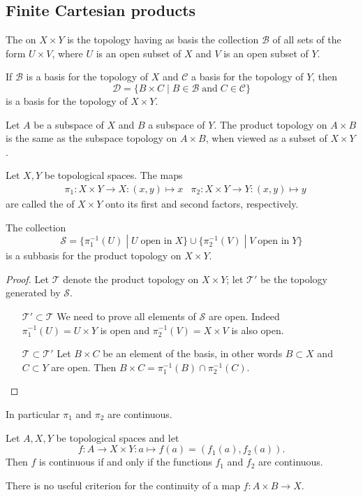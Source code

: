 \subsection{Finite Cartesian products}
\begin{definition}
The  on $X\times Y$ is the topology having as basis the collection $\mathcal{B}$ of all sets of the form $U\times V$, where $U$ is an open subset of $X$ and $V$ is an open subset of $Y$.
\end{definition}
\begin{lemma} \label{basisFiniteProductTopology}
If $\mathcal{B}$ is a basis for the topology of $X$ and $\mathcal{C}$ a basis for the topology of $Y$, then
\[ \mathcal{D} = \{ B\times C\;|\; B\in \mathcal{B}\;\text{and}\; C\in \mathcal{C} \} \]
is a basis for the topology of $X\times Y$.
\end{lemma}
\begin{proposition}
Let $A$ be a subspace of $X$ and $B$ a subspace of $Y$. The product topology on $A\times B$ is the same as the subspace topology on $A\times B$, when viewed as a subset of $X\times Y$.
\end{proposition}

\begin{definition}
Let $X,Y$ be topological spaces. The maps
\begin{align*}
&\pi_1: X\times Y\to X: (x,y)\mapsto x
&\pi_2: X\times Y\to Y: (x,y)\mapsto y
\end{align*}
are called the  of $X\times Y$ onto its first and second factors, respectively.
\end{definition}
\begin{proposition}
The collection
\[ \mathcal{S} = \{ \pi_1^{-1}(U)\;|\; U\;\text{open in}\; X \}\cup \{ \pi_2^{-1}(V)\;|\; V\;\text{open in}\;Y  \} \]
is a subbasis for the product topology on $X\times Y$.
\end{proposition}
\begin{proof}
Let $\mathcal{T}$ denote the product topology on $X\times Y$; let $\mathcal{T'}$ be the topology generated by $\mathcal{S}$.
\begin{itemize}[leftmargin=2cm]
\item[$\boxed{\mathcal{T}'\subset\mathcal{T}}$] We need to prove all elements of $\mathcal{S}$ are open. Indeed $\pi_1^{-1}(U) = U\times Y$ is open and $\pi_2^{-1}(V) = X\times V$ is also open.
\item[$\boxed{\mathcal{T}\subset\mathcal{T}'}$] Let $B\times C$ be an element of the basis, in other words $B\subset X$ and $C\subset Y$ are open. Then $B\times C = \pi_1^{-1}(B)\cap \pi_2^{-1}(C)$.
\end{itemize}
\end{proof}
In particular $\pi_1$ and $\pi_2$ are continuous.
\begin{proposition}\label{continuityCompositeFunctions}
Let $A,X,Y$ be topological spaces and let
\[ f:A\to X\times Y: a\mapsto f(a) = (f_1(a),f_2(a)). \]
Then $f$ is continuous \textup{if and only if} the functions $f_1$ and $f_2$ are continuous.
\end{proposition}
There is no useful criterion for the continuity of a map $f:A\times B \to X$.


